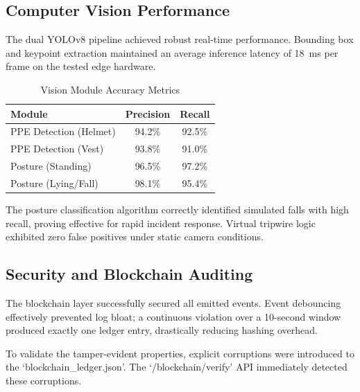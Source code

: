 \documentclass[conference]{IEEEtran}
\begin{document}
\subsection{Computer Vision Performance}
The dual YOLOv8 pipeline achieved robust real-time performance. Bounding box and keypoint extraction maintained an average inference latency of 18~ms per frame on the tested edge hardware.

\begin{table}[htbp]
  \caption{Vision Module Accuracy Metrics}
  \label{tab:vision_accuracy}
  \centering
  \begin{tabular}{lcc}
    \toprule
    \textbf{Module} & \textbf{Precision} & \textbf{Recall} \\
    \midrule
    PPE Detection (Helmet) & 94.2\% & 92.5\% \\
    PPE Detection (Vest) & 93.8\% & 91.0\% \\
    Posture (Standing) & 96.5\% & 97.2\% \\
    Posture (Lying/Fall) & 98.1\% & 95.4\% \\
    \bottomrule
  \end{tabular}
\end{table}

The posture classification algorithm correctly identified simulated falls with high recall, proving effective for rapid incident response. Virtual tripwire logic exhibited zero false positives under static camera conditions.

\subsection{Security and Blockchain Auditing}
The blockchain layer successfully secured all emitted events. Event debouncing effectively prevented log bloat; a continuous violation over a 10-second window produced exactly one ledger entry, drastically reducing hashing overhead.

To validate the tamper-evident properties, explicit corruptions were introduced to the `blockchain\_ledger.json'. The `/blockchain/verify' API immediately detected these corruptions.
\end{document}
